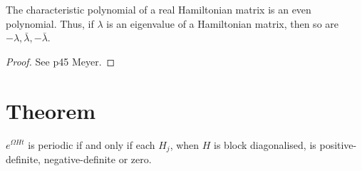 \begin{lemma} The characteristic polynomial of a real Hamiltonian matrix is an even polynomial. Thus, if $\lambda$ is an eigenvalue of a Hamiltonian matrix, then so are $-\lambda, \bar{\lambda}, -\bar{\lambda}$. \label{lem:hamevalues} \end{lemma}
\begin{proof}
See p45 Meyer.
\end{proof}

\section{Theorem}
\begin{theorem}$e^{\Omega Ht}$ is periodic if and only if each $H_j$, when $H$ is block diagonalised, is positive-definite, negative-definite or zero.
\end{theorem}
